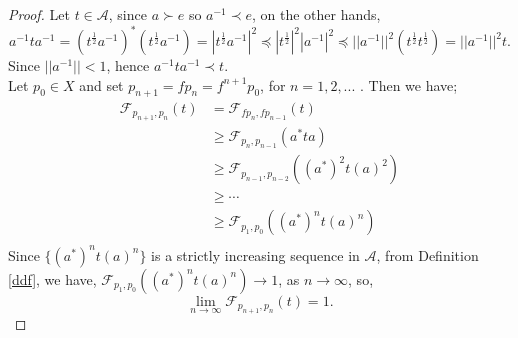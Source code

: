 \documentclass{amsart}%
\theoremstyle{plain}
\numberwithin{equation}{section}
\begin{document}
\begin{proof}
	Let $t \in \mathcal{A}$, since $a\succ e$ so $a^{-1}\prec e$, on the other hands, 
	$$a^{-1}ta^{-1}=(t^{\frac{1}{2}}a^{-1})^*(t^{\frac{1}{2}}a^{-1})=| t^{\frac{1}{2}}a^{-1}|^2\preceq |t^{\frac{1}{2}}|^2|a^{-1}|^2\preceq ||a^{-1}||^2(t^{\frac{1}{2}}t^{\frac{1}{2}})=||a^{-1}||^2t.$$
	Since $||a^{-1}||<1$, hence $a^{-1}ta^{-1}\prec t.$\\
	Let $p_0\in X$ and set $p_{n+1}=fp_n=f^{n+1}p_0$, for $n= 1,2, ...$ . Then we have;
	\begin{align*}
		\mathcal{F}_{p_{n+1},p_{n}}(t)&=\mathcal{F}_{fp_{n},fp_{n-1}}(t)\\
		&\geq\mathcal{F}_{p_{n},p_{n-1}}(a^*ta)\\
		&\geq\mathcal{F}_{p_{n-1},p_{n-2}}\left( (a^*)^2t(a)^2\right)\\
		&\geq \cdots\\
		&\geq\mathcal{F}_{p_{1},p_{0}}\left( (a^*)^nt(a)^n\right)\\
	\end{align*}
	Since $\{ (a^*)^nt(a)^n\}$ is a strictly increasing sequence in $\mathcal{A}$, from Definition \ref{ddf}, we have, $\mathcal{F}_{p_{1},p_{0}}\left( (a^*)^nt(a)^n\right) \to 1$, as $n\to \infty$, so, 
	\begin{equation*}
		\lim_{n\to \infty} \mathcal{F}_{p_{n+1},p_{n}}(t)=1.
	\end{equation*}
	

\end{proof}
\end{document}
